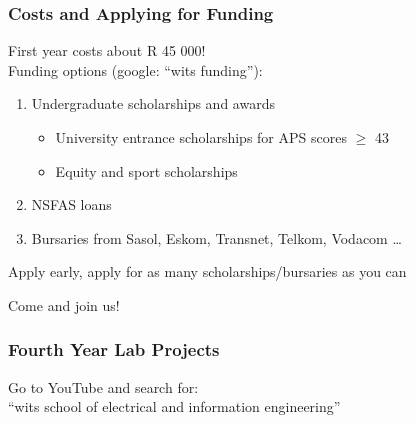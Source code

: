 \documentclass{beamer}
\begin{document}
\begin{frame}
\frametitle{Costs and Applying for Funding}
 First year costs about \alert{R 45 000!}\\
\vspace{3mm}
 Funding options (google: ``wits funding''):
  \begin{enumerate}
    \item Undergraduate scholarships and awards
    \begin{itemize}
    \item University entrance scholarships for APS scores $\geq$ 43
    \item Equity and sport scholarships
    \end{itemize}
    \item NSFAS loans
    \item Bursaries from Sasol, Eskom, Transnet, Telkom, Vodacom \dots
  \end{enumerate}
  \vspace{3mm}
  Apply early, apply for as many scholarships/bursaries as you can
\end{frame}

\begin{frame}[plain,c]
\begin{center}
\Huge Come and join us!
\end{center}
\end{frame}

\begin{frame}
  \frametitle{Fourth Year Lab Projects}
  Go to YouTube and search for: \\
  \vspace{5mm}
  {
    \centering
  ``wits school of electrical and information engineering''
  }
\end{frame}
\end{document}
